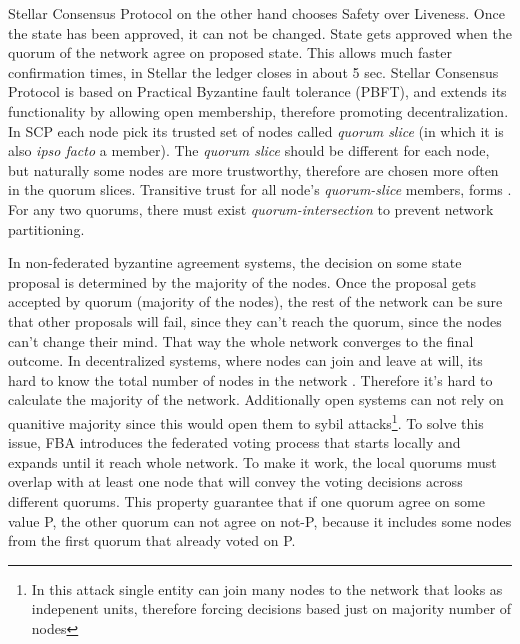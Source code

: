 \documentclass[nostrict]{szablonPG}
\begin{document}
Stellar Consensus Protocol on the other hand chooses Safety over Liveness. Once the state has been approved, it can not be changed. State gets approved when the quorum of the network agree on proposed state. This allows much faster confirmation times, in Stellar the ledger closes in about 5 sec. 
Stellar Consensus Protocol is based on Practical Byzantine fault tolerance (PBFT)\cite{castro1999practical}, and extends its functionality by allowing open membership, therefore promoting decentralization. In SCP each node pick its trusted set of nodes called \textit{quorum slice} (in which it is also \textit{ipso facto} a member). The \textit{quorum slice} should be different for each node, but naturally some nodes are more trustworthy, therefore are chosen more often in the quorum slices. Transitive trust for all node's \textit{quorum-slice} members, forms . For any two quorums, there must exist \textit{quorum-intersection} to prevent network partitioning. 

In non-federated byzantine agreement systems, the decision on some state proposal is determined by the majority of the nodes. Once the proposal gets accepted by quorum (majority of the nodes), the rest of the network can be sure that other proposals will fail, since they can't reach the quorum, since the nodes can't change their mind. That way the whole network converges to the final outcome.
In decentralized systems, where nodes can join and leave at will, its hard to know the total number of nodes in the network . Therefore it's hard to calculate the majority of the network. Additionally open systems can not rely on quanitive majority since this would open them to sybil attacks\footnote{In this attack single entity can join many nodes to the network that looks as indepenent units, therefore forcing decisions based just on majority number of nodes}. To solve this issue, FBA introduces the federated voting process that starts locally and expands until it reach whole network. To make it work, the local quorums must overlap with at least one node that will convey the voting decisions across different quorums. This property guarantee that if one quorum agree on some value P, the other quorum can not agree on not-P, because it includes some nodes from the first quorum that already voted on P.
\end{document}
